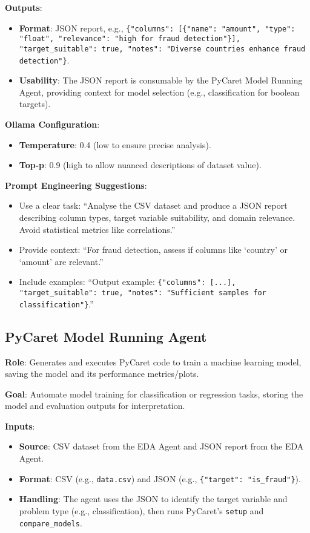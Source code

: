 \documentclass{article}
\begin{document}
\textbf{Outputs}:
\begin{itemize}[label=--]
    \item \textbf{Format}: JSON report, e.g., \texttt{\{"columns": [\{"name": "amount", "type": "float", "relevance": "high for fraud detection"\}], "target\_suitable": true, "notes": "Diverse countries enhance fraud detection"\}}.
    \item \textbf{Usability}: The JSON report is consumable by the PyCaret Model Running Agent, providing context for model selection (e.g., classification for boolean targets).
\end{itemize}

\textbf{Ollama Configuration}:
\begin{itemize}[label=--]
    \item \textbf{Temperature}: 0.4 (low to ensure precise analysis).
    \item \textbf{Top-p}: 0.9 (high to allow nuanced descriptions of dataset value).
\end{itemize}

\textbf{Prompt Engineering Suggestions}:
\begin{itemize}[label=--]
    \item Use a clear task: “Analyse the CSV dataset and produce a JSON report describing column types, target variable suitability, and domain relevance. Avoid statistical metrics like correlations.”
    \item Provide context: “For fraud detection, assess if columns like ‘country’ or ‘amount’ are relevant.”
    \item Include examples: “Output example: \texttt{\{"columns": [...], "target\_suitable": true, "notes": "Sufficient samples for classification"\}}.”
\end{itemize}

\subsection{PyCaret Model Running Agent}

\textbf{Role}: Generates and executes PyCaret code to train a machine learning model, saving the model and its performance metrics/plots.

\textbf{Goal}: Automate model training for classification or regression tasks, storing the model and evaluation outputs for interpretation.

\textbf{Inputs}:
\begin{itemize}[label=--]
    \item \textbf{Source}: CSV dataset from the EDA Agent and JSON report from the EDA Agent.
    \item \textbf{Format}: CSV (e.g., \texttt{data.csv}) and JSON (e.g., \texttt{\{"target": "is\_fraud"\}}).
    \item \textbf{Handling}: The agent uses the JSON to identify the target variable and problem type (e.g., classification), then runs PyCaret’s \texttt{setup} and \texttt{compare\_models}.
\end{itemize}
\end{document}
